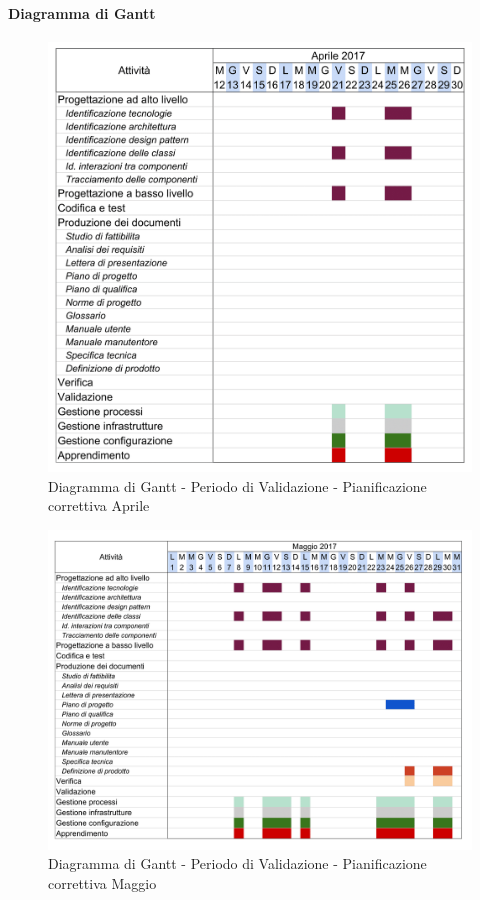 			\paragraph{Diagramma di Gantt}
			\begin{figure}[H]
				\centering
				\includegraphics[width=\textwidth]{img/Gantt/FiAprile.png}
				\caption{Diagramma di Gantt - Periodo di Validazione - Pianificazione correttiva Aprile}
			\end{figure}
			\newpage
			\begin{figure}[H]
				\centering
				\includegraphics[width=\textwidth]{img/Gantt/FiMaggio.png}
				\caption{Diagramma di Gantt - Periodo di Validazione - Pianificazione correttiva Maggio}
			\end{figure}
